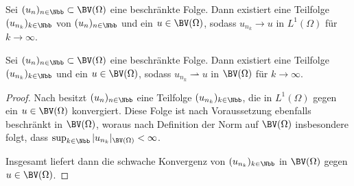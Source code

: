 \begin{theorem}
  \label{thm:l1ConvergentSubsequence}
  Sei $(u_n)_{n\in\Nbb}\subset \BV(\Omega)$ eine beschränkte Folge. Dann 
  existiert eine Teilfolge $(u_{n_k})_{k\in\Nbb}$ von
  $(u_n)_{n\in\Nbb}$ und ein $u\in\BV(\Omega)$, sodass
  $u_{n_k}\to u$ in $L^1(\Omega)$ für $k\to \infty$.
\end{theorem}

\begin{theorem}
  \label{thm:compactness}
  Sei $(u_n)_{n\in\Nbb}\subset \BV(\Omega)$ eine beschränkte Folge. Dann 
  existiert eine Teilfolge $(u_{n_k})_{k\in\Nbb}$ und ein $u\in\BV(\Omega)$,
  sodass $u_{n_k}\rightharpoonup u$ in $\BV(\Omega)$ für $k\rightarrow\infty$.
\end{theorem}

\begin{proof}
  Nach  besitzt $(u_n)_{n\in\Nbb}$ eine
  Teilfolge $(u_{n_k})_{k\in\Nbb}$, die in $L^1(\Omega)$ gegen ein
  $u\in\BV(\Omega)$ konvergiert.
  Diese Folge ist nach Voraussetzung ebenfalls beschränkt in 
  $\BV(\Omega)$, woraus nach Definition der Norm auf $\BV(\Omega)$ insbesondere
  folgt, dass
  $\sup_{k\in\Nbb}|u_{n_k}|_{\BV(\Omega)}< \infty$. 
  
  Insgesamt liefert  dann die schwache Konvergenz von
  $(u_{n_k})_{k\in\Nbb}$ in $\BV(\Omega)$ gegen $u\in\BV(\Omega)$.
\end{proof}
